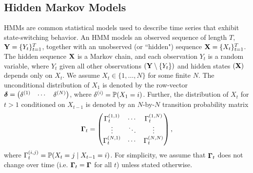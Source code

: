 \subsection{Hidden Markov Models}

HMMs are common statistical models used to describe time series that exhibit state-switching behavior. An HMM models an observed sequence of length $T$, $\mathbf{Y} = \{Y_t\}_{t=1}^T$, together with an unobserved (or  ``hidden") sequence $\mathbf{X} = \{X_t\}_{t=1}^T$. The hidden sequence $\mathbf{X}$ is a Markov chain, and each observation $Y_t$ is a random variable, where $Y_t$ given all other observations $(\mathbf{Y} \setminus \{Y_t\})$ and hidden states $(\mathbf{X})$ depends only on $X_t$. %
We assume $X_t \in \{1,\ldots,N\}$ for some finite $N$. The unconditional distribution of $X_1$ is denoted by the row-vector
%
$\boldsymbol{\delta} = \begin{pmatrix} \delta^{(1)} & \cdots & \delta^{(N)} \end{pmatrix}$,
%
where $\delta^{(i)} = \mathbb{P}(X_1 = i)$. Further, the distribution of $X_t$ for $t > 1$ conditioned on $X_{t-1}$ is denoted by an $N$-by-$N$ transition probability matrix 
%
\begin{equation}
    \boldsymbol{\Gamma}_t = \begin{pmatrix} 
    \Gamma_t^{(1,1)} & \cdots & \Gamma_t^{(1,N)} \\
    \vdots & \ddots & \vdots \\
    \Gamma_t^{(N,1)} & \cdots & \Gamma_t^{(N,N)} \\
    \end{pmatrix},
\end{equation}
%
where $\Gamma_t^{(i,j)} = \mathbb{P}(X_t = j \mid X_{t-1} = i)$. %
For simplicity, we assume that $\boldsymbol{\Gamma}_t$ does not change over time (i.e. $\boldsymbol{\Gamma}_t = \boldsymbol{\Gamma}$ for all $t$) unless stated otherwise. 


